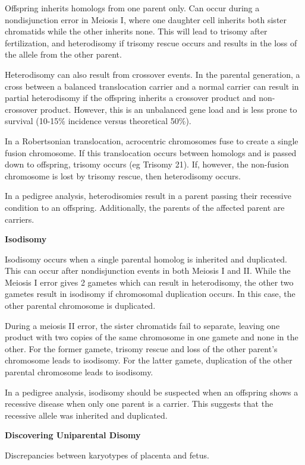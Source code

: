 \documentclass{tufte-handout}
\theoremstyle{noparens}
\begin{document}
Offspring inherits homologs from one parent only. Can occur during a nondisjunction error in Meiosis I, where one daughter cell inherits both sister chromatids while the other inherits none. This will lead to trisomy after fertilization, and heterodisomy if trisomy rescue occurs and results in the loss of the allele from the other parent.

Heterodisomy can also result from crossover events. In the parental generation, a cross between a balanced translocation carrier and a normal carrier can result in partial heterodisomy if the offspring inherits a crossover product and non-crossover product. However, this is an unbalanced gene load and is less prone to survival (10-15\% incidence versus theoretical 50\%).

In a Robertsonian translocation, acrocentric chromosomes fuse to create a single fusion chromosome. If this translocation occurs between homologs and is passed down to offspring, trisomy occurs (eg Trisomy 21). If, however, the non-fusion chromosome is lost by trisomy rescue, then heterodisomy occurs.

In a pedigree analysis, heterodisomies result in a parent passing their recessive condition to an offspring. Additionally, the parents of the affected parent are carriers. 

\textbf{Isodisomy}

Isodisomy occurs when a single parental homolog is inherited and duplicated. This can occur after nondisjunction events in both Meiosis I and II. While the Meiosis I error gives 2 gametes which can result in heterodisomy, the other two gametes result in isodisomy if chromosomal duplication occurs. In this case, the other parental chromosome is duplicated.

During a meiosis II error, the sister chromatids fail to separate, leaving one product with two copies of the same chromosome in one gamete and none in the other. For the former gamete, trisomy rescue and loss of the other parent's chromosome leads to isodisomy. For the latter gamete, duplication of the other parental chromosome leads to isodisomy.

In a pedigree analysis, isodisomy should be suspected when an offspring shows a recessive disease when only one parent is a carrier. This suggests that the recessive allele was inherited and duplicated.
 
 \textbf{Discovering Uniparental Disomy}
 
 Discrepancies between karyotypes of placenta and fetus.
 
\end{document}
